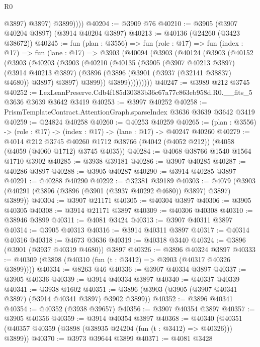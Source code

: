 \begin{lexlean}{R0}
\begin{coremodule}
                @3897)
              @3897)
            @3899))))
@40204 := @3909 @76
@40210 := @3905 (@3907 @40204 @3897) (@3914 @40204 @3897)
@40213 := @40136 (@24260 (@3423 @38672))
@40245 := fun (plan : @3556) =>
  fun (role : @17) =>
  fun (index : @17) =>
  fun (lane : @17) =>
  @3903
    (@40094
      (@3903
        (@40124
          (@3903
            (@40152
              (@3903
                (@40203
                  (@3903
                    (@40210
                      (@40135
                        (@3905
                          (@3907 @40213 @3897)
                          (@3914 @40213 @3897)
                          (@3896 (@3896 (@3901 (@3937 (@32141 @38837) @4680)) @3897) @3897)
                          @3899))
                      @3899)))))))))
@40247 := @3989 @212 @3745
@40252 := LexLeanPreserve.Cdb4f185d30383b36c67a77c863eb958d.R0.__fits_5 @3636 @3639 @3642 @3419
@40253 := @3997 @40252
@40258 := PrismTemplateContract.AttentionGraph.sparseIndex @3636 @3639 @3642 @3419
@40259 := @24824 @40258
@40260 := @40253 @40259
@40265 := (plan : @3556) -> (role : @17) -> (index : @17) -> (lane : @17) -> @40247 @40260
@40279 := @4014
    @212
    @3745
    @40260
    @1712
    @38766
    (@4042 (@4052 @212))
    (@4058 (@4059 (@4060 @1712) @3745 @4035))
@40284 := @4068 @38766 @1540 @1564 @1710 @3902
@40285 := @3938 @39181
@40286 := @3907 @40285
@40287 := @40286 @3897
@40288 := @3905 @40287
@40290 := @3914 @40285 @3897
@40291 := @40288 @40290
@40292 := @32381 @39189
@40303 := @4079 (@3903 (@40291 (@3896 (@3896 (@3901 (@3937 @40292 @4680)) @3897) @3897) @3899))
@40304 := @3907 @21171
@40305 := @40304 @3897
@40306 := @3905 @40305
@40308 := @3914 @21171 @3897
@40309 := @40306 @40308
@40310 := @38946 @3899
@40311 := @4081 @3424
@40313 := @3907 @40311 @3897
@40314 := @3905 @40313
@40316 := @3914 @40311 @3897
@40317 := @40314 @40316
@40318 := @4673 @3636
@40319 := @40318 @3440
@40324 := @3896 (@3901 (@3937 @40319 @4680)) @3897
@40326 := @3896 @40324 @3897
@40333 := @40309 (@3898 (@40310 (fun (t : @3412) => @3903 (@40317 @40326 @3899))))
@40334 := @8263 @46
@40336 := @3907 @40334 @3897
@40337 := @3905 @40336
@40339 := @3914 @40334 @3897
@40340 := @40337 @40339
@40341 := @3938 @1602
@40351 := @3896 (@3903 (@3905 (@3907 @40341 @3897) (@3914 @40341 @3897) @3902 @3899))
@40352 := @3896 @40341
@40354 := @40352 (@3938 @39657)
@40356 := @3907 @40354 @3897
@40357 := @3905 @40356
@40359 := @3914 @40354 @3897
@40368 := @40340 (@40351 (@40357 @40359 (@3898 (@38935 @24204 (fun (t : @3412) => @40326))) @3899))
@40370 := @3973 @39644 @3899
@40371 := @4081 @3428

\end{coremodule}
\end{lexlean}
